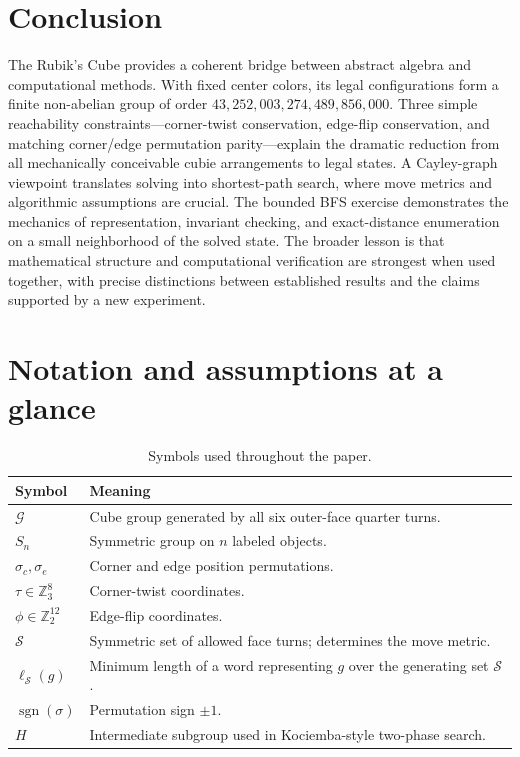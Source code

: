 \documentclass[11pt,a4paper]{article}
\theoremstyle{definition}
\theoremstyle{remark}
\DeclareMathOperator{\sgn}{sgn}
\newcommand{\Z}{\mathbb{Z}}
\newcommand{\G}{\mathcal{G}}
\newcommand{\moves}{\mathcal{S}}
\begin{document}
\section{Conclusion}
The Rubik's Cube provides a coherent bridge between abstract algebra and computational methods. With fixed center colors, its legal configurations form a finite non-abelian group of order $43{,}252{,}003{,}274{,}489{,}856{,}000$. Three simple reachability constraints---corner-twist conservation, edge-flip conservation, and matching corner/edge permutation parity---explain the dramatic reduction from all mechanically conceivable cubie arrangements to legal states. A Cayley-graph viewpoint translates solving into shortest-path search, where move metrics and algorithmic assumptions are crucial. The bounded BFS exercise demonstrates the mechanics of representation, invariant checking, and exact-distance enumeration on a small neighborhood of the solved state. The broader lesson is that mathematical structure and computational verification are strongest when used together, with precise distinctions between established results and the claims supported by a new experiment.

\appendix
\section{Notation and assumptions at a glance}
\begin{table}[h!]
\centering
\caption{Symbols used throughout the paper.}
\begin{tabularx}{\linewidth}{@{}lX@{}}
\toprule
Symbol & Meaning\\\midrule
$\G$ & Cube group generated by all six outer-face quarter turns.\\
$S_n$ & Symmetric group on $n$ labeled objects.\\
$\sigma_c,\sigma_e$ & Corner and edge position permutations.\\
$\tau\in\Z_3^8$ & Corner-twist coordinates.\\
$\phi\in\Z_2^{12}$ & Edge-flip coordinates.\\
$\moves$ & Symmetric set of allowed face turns; determines the move metric.\\
$\ell_{\moves}(g)$ & Minimum length of a word representing $g$ over the generating set $\moves$.\\
$\sgn(\sigma)$ & Permutation sign $\pm1$.\\
$H$ & Intermediate subgroup used in Kociemba-style two-phase search.\\
\bottomrule
\end{tabularx}
\end{table}
\end{document}
